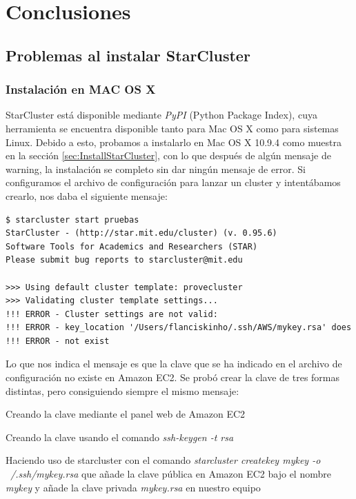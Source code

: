 \documentclass{article}
\begin{document}
\clearpage
\section{Conclusiones}\label{sec:Conclusion}

\subsection{Problemas al instalar StarCluster}

\subsubsection{Instalación en MAC OS X}
	StarCluster está disponible mediante \emph{PyPI} (Python Package Index), cuya herramienta se encuentra disponible tanto para Mac OS X como para sistemas Linux. Debido a esto, probamos a instalarlo en Mac OS X 10.9.4 como muestra en la sección \ref{sec:InstallStarCluster}, con lo que después de algún mensaje de warning, la instalación se completo sin dar ningún mensaje de error. Si configuramos el archivo de configuración para lanzar un cluster y intentábamos crearlo, nos daba el siguiente mensaje:
\begin{lstlisting}[style=miniBash]
$ starcluster start pruebas
StarCluster - (http://star.mit.edu/cluster) (v. 0.95.6)
Software Tools for Academics and Researchers (STAR)
Please submit bug reports to starcluster@mit.edu

>>> Using default cluster template: provecluster
>>> Validating cluster template settings...
!!! ERROR - Cluster settings are not valid:
!!! ERROR - key_location '/Users/flanciskinho/.ssh/AWS/mykey.rsa' does
!!! ERROR - not exist
\end{lstlisting}
Lo que nos indica el mensaje es que la clave que se ha indicado en el archivo de configuración no existe en Amazon EC2. Se probó crear la clave de tres formas distintas, pero consiguiendo siempre el mismo mensaje:
{\setlength{\parskip}{0mm}\begin{enumerate}
{\setlength{\parskip}{0mm}
	\item Creando la clave mediante el panel web de Amazon EC2
	\item Creando la clave usando el comando \emph{ssh-keygen -t rsa}
	\item Haciendo uso de starcluster con el comando \emph{starcluster createkey mykey -o ~/.ssh/mykey.rsa} que añade la clave pública en Amazon EC2 bajo el nombre \emph{mykey} y añade la clave privada \emph{mykey.rsa} en nuestro equipo
}
\end{enumerate}}
\end{document}
